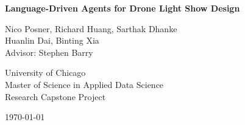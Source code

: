 \begin{titlepage}
\centering
\vspace*{2in}
{\fontsize{18}{22}\bfseries\selectfont
Language-Driven Agents for Drone Light Show Design\par}
\vspace{1in}
{\fontsize{12}{14}\selectfont
Nico Posner, Richard Huang, Sarthak Dhanke\\
Huanlin Dai, Binting Xia\\
Advisor: Stephen Barry\par}
\vspace{0.5in}
{\fontsize{14}{16}\selectfont
University of Chicago\\
Master of Science in Applied Data Science\\
Research Capstone Project\par}
\vspace{0.5in}
{\fontsize{14}{16}\selectfont\today\par}
\end{titlepage}
